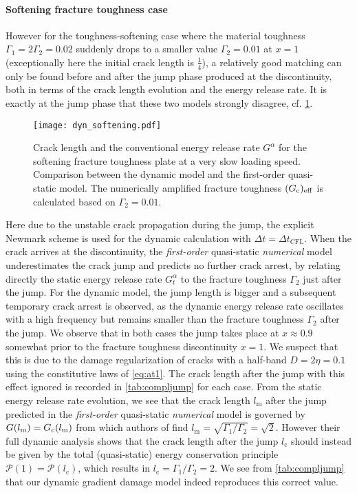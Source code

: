 \paragraph{Softening fracture toughness case} However for the toughness-softening case where the material toughness $\Gamma_1=2\Gamma_2=0.02$ suddenly drops to a smaller value $\Gamma_2=0.01$ at $x=1$ (exceptionally here the initial crack length is $\frac{1}{4}$), a relatively good matching can only be found before and after the jump phase produced at the discontinuity, both in terms of the crack length evolution and the energy release rate. It is exactly at the jump phase that these two models strongly disagree, cf. \cref{eq:ressoftening}.
\begin{figure}[htbp]
\centering
\texttt{[image: dyn\_softening.pdf]}
\caption{Crack length and the conventional energy release rate $G^\alpha$ for the softening fracture toughness plate at a very slow loading speed. Comparison between the dynamic model and the first-order quasi-static model. The numerically amplified fracture toughness $(G_\mathrm{c})_\mathrm{eff}$ is calculated based on $\Gamma_2=0.01$.} \label{eq:ressoftening}
\end{figure}
Here due to the unstable crack propagation during the jump, the explicit Newmark scheme is used for the dynamic calculation with $\Delta t=\Delta t_\mathrm{CFL}$. When the crack arrives at the discontinuity, the \emph{first-order} quasi-static \emph{numerical} model underestimates the crack jump and predicts no further crack arrest, by relating directly the static energy release rate $G^\alpha_t$ to the fracture toughness $\Gamma_2$ just after the jump. For the dynamic model, the jump length is bigger and a subsequent temporary crack arrest is observed, as the dynamic energy release rate oscillates with a high frequency but remains smaller than the fracture toughness $\Gamma_2$ after the jump. We observe that in both cases the jump takes place at $x\approx 0.9$ somewhat prior to the fracture toughness discontinuity $x=1$. We suspect that this is due to the damage regularization of cracks with a half-band $D=2\eta=0.1$ using the constitutive laws of \eqref{eq:at1}. The crack length after the jump with this effect ignored is recorded in \cref{tab:compljump} for each case. From the static energy release rate evolution, we see that the crack length $l_\mathrm{m}$ after the jump predicted in the \emph{first-order} quasi-static \emph{numerical} model is governed by $G(l_\mathrm{m})=G_\mathrm{c}(l_\mathrm{m})$ from which authors of \cite{DumouchelMarigoCharlotte:2008} find $l_\mathrm{m}=\sqrt{\Gamma_1/\Gamma_2}=\sqrt{2}$. However their full dynamic analysis shows that the crack length after the jump $l_\mathrm{c}$ should instead be given by the total (quasi-static) energy conservation principle $\mathcal{P}(1)=\mathcal{P}(l_\mathrm{c})$, which results in $l_\mathrm{c}=\Gamma_1/\Gamma_2=2$. We see from \cref{tab:compljump} that our dynamic gradient damage model indeed reproduces this correct value.
